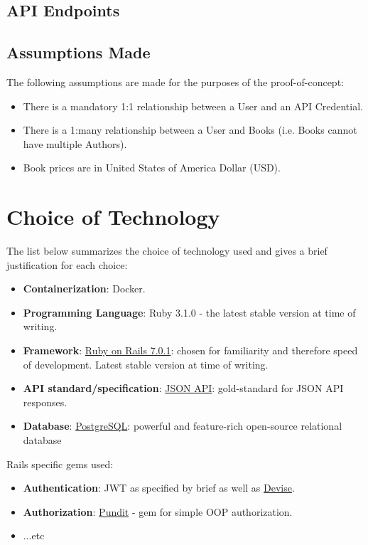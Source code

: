\documentclass[a4paper]{article}
\begin{document}
\subsection{API Endpoints}

\subsection{Assumptions Made}

The following assumptions are made for the purposes of the proof-of-concept:

\begin{itemize}
  \item There is a mandatory 1:1 relationship between a User and an API Credential.
  \item There is a 1:many relationship between a User and Books (i.e. Books cannot have multiple Authors).
  \item Book prices are in United States of America Dollar (USD).
\end{itemize}

\section{Choice of Technology}

The list below summarizes the choice of technology used and gives a brief
justification for each choice:

\begin{itemize}
  \item \textbf{Containerization}: Docker.
  \item \textbf{Programming Language}: Ruby 3.1.0 - the latest stable version at time of writing.
  \item \textbf{Framework}: \href{https://rubyonrails.org/}{Ruby on Rails 7.0.1}: chosen for familiarity and therefore speed of development. Latest stable version at time of writing.
  \item \textbf{API standard/specification}: \href{https://jsonapi.org/}{JSON API}: gold-standard for JSON API responses.
  \item \textbf{Database}: \href{https://www.postgresql.org/}{PostgreSQL}: powerful and feature-rich open-source relational database
\end{itemize}

Rails specific gems used:

\begin{itemize}
  \item \textbf{Authentication}: JWT as specified by brief as well as \href{https://github.com/heartcombo/devise}{Devise}.
  \item \textbf{Authorization}: \href{https://github.com/varvet/pundit}{Pundit} - gem for simple OOP authorization.
  \item ...etc
\end{itemize}
\end{document}
